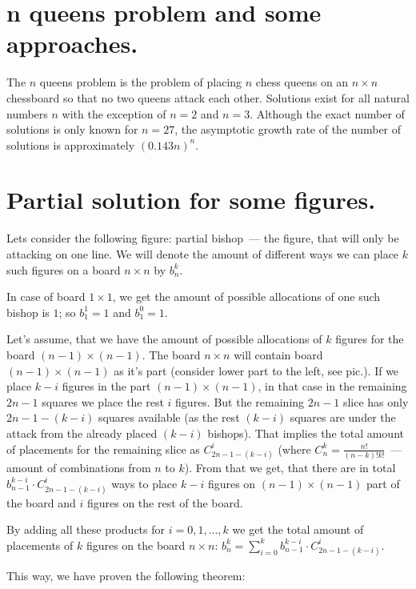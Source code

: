 \documentclass[a4paper,11pt]{article}
\begin{document}
\begin{large}
\section*{n queens problem and some approaches.}

The $n$ queens problem is the problem of placing $n$ chess queens on an $n\times n$ chessboard so that no two queens attack each other. Solutions exist for all natural numbers $n$ with the exception of $n = 2$ and $n = 3$. Although the exact number of solutions is only known for $n = 27$, the asymptotic growth rate of the number of solutions is approximately $(0.143 n)^{n}$.


\section*{Partial solution for some figures.}

Lets consider the following figure: partial bishop~--- the figure, that will only be attacking on one line. We will denote the amount of different ways we can place $k$ such figures on a board $n\times n$ by $b_{n}^{k}$.

In case of board $1\times 1$, we get the amount of possible allocations of one such bishop is $1$; so $b_{1}^{1} = 1$ and $b_{1}^{0} = 1$. 

Let's assume, that we have the amount of possible allocations of $k$ figures for the board $(n-1)\times (n-1)$. The board $n\times n$ will contain board $(n-1)\times (n-1)$ as it's part (consider lower part to the left, see pic.). If we place $k-i$ figures in the part $(n-1)\times (n-1)$, in that case in the remaining $2n-1$ squares we place the rest $i$ figures. But the remaining $2n-1$ slice has only $2n-1-(k-i)$ squares available (as the rest $(k-i)$ squares are under the attack from the already placed $(k-i)$ bishops). That implies the total amount of placements for the remaining slice as $C_{2n-1-(k-i)}^{i}$ (where $C_{n}^{k}=\frac{n!}{(n-k)!k!}$~--- amount of combinations from $n$ to $k$). From that we get, that there are in total $b_{n-1}^{k-i} \cdot C_{2n-1-(k-i)}^{i}$ ways to place $k-i$ figures on $(n-1)\times (n-1)$ part of the board and $i$ figures on the rest of the board.

By adding all these products for $i=0,1,...,k$ we get the total amount of placements of $k$ figures on the board $n\times n$: $b_{n}^{k}=\sum\limits_{i=0}^{k} b_{n-1}^{k-i} \cdot C_{2n-1-(k-i)}^{i}$.

This way, we have proven the following theorem:


\end{large}
\end{document}
